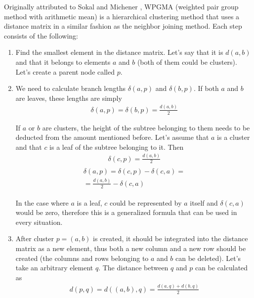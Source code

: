 \documentclass[11pt,twocolumn]{article}
\begin{document}
Originally attributed to Sokal and Michener \cite{sokal58}, WPGMA (weighted pair group method with arithmetic mean) is a hierarchical clustering method that uses a distance matrix in a similar fashion as the neighbor joining method. Each step consists of the following:

\begin{enumerate}
\item Find the smallest element in the distance matrix. Let's say that it is $d(a, b)$ and that it belongs to elements $a$ and $b$ (both of them could be clusters). Let's create a parent node called $p$.

\item We need to calculate branch lengths $\delta(a, p)$ and $\delta(b, p)$. If both $a$ and $b$ are leaves, these lengths are simply
\begin{align}
\delta(a, p) = \delta(b, p) = \frac{d(a, b)}{2}
\end{align}

If $a$ or $b$ are clusters, the height of the subtree belonging to them needs to be deducted from the amount mentioned before. Let's assume that $a$ is a cluster and that $c$ is a leaf of the subtree belonging to it. Then
\begin{align}
\delta(c, p) = \frac{d(a, b)}{2}
\end{align}
\begin{align}
\begin{split}
\delta(a, p) = \delta(c, p) - \delta(c, a) = \\
= \frac{d(a, b)}{2} - \delta(c, a)
\end{split}
\end{align}

In the case where $a$ is a leaf, $c$ could be represented by $a$ itself and $\delta(c, a)$ would be zero, therefore this is a generalized formula that can be used in every situation.

\item After cluster $p = (a, b)$ is created, it should be integrated into the distance matrix as a new element, thus both a new column and a new row should be created (the columns and rows belonging to $a$ and $b$ can be deleted). Let's take an arbitrary element $q$. The distance between $q$ and $p$ can be calculated as
\begin{align}
d(p, q) = d((a, b), q) = \frac{d(a, q) + d(b, q)}{2}
\end{align}

\end{enumerate}
\end{document}
